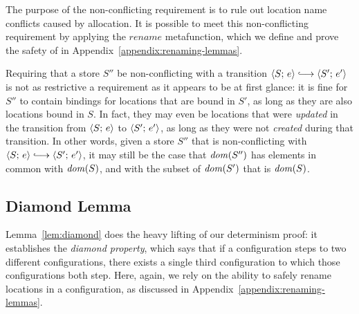 \DefNonConflicting

\noindent The purpose of the non-conflicting requirement is to rule out location
name conflicts caused by allocation.  It is possible to meet
this non-conflicting requirement by applying the $\mathit{rename}$
metafunction, which we define and prove the safety of in
Appendix~\ref{appendix:renaming-lemmas}.

Requiring that a store $S''$ be non-conflicting with a transition
$\config{S}{e} \parstepsto \config{S'}{e'}$ is not as restrictive a
requirement as it appears to be at first glance: it is fine for $S''$
to contain bindings for locations that are bound in $S'$, as long as
they are also locations bound in $S$.  In fact, they may even be
locations that were \emph{updated} in the transition from
$\langle S;\, e \rangle$ to $\langle S';\, e' \rangle$, as long as they were not
\emph{created} during that transition.  In other words, given a store $S''$ that is
non-conflicting with $\config{S}{e} \parstepsto \config{S'}{e'}$, it
may still be the case that $\mathit{dom}(S'')$ has elements in common with
$\mathit{dom}(S)$, and with the subset of $\mathit{dom}(S')$ that is $\mathit{dom}(S)$.

\subsection{Diamond Lemma}

Lemma~\ref{lem:diamond} does the heavy lifting of our determinism
proof: it establishes the \emph{diamond property}, which says that if a configuration
steps to two different configurations, there exists a single
third configuration to which those configurations both step.
Here, again, we rely on the ability to safely rename locations in a
configuration, as discussed in
Appendix~\ref{appendix:renaming-lemmas}.

